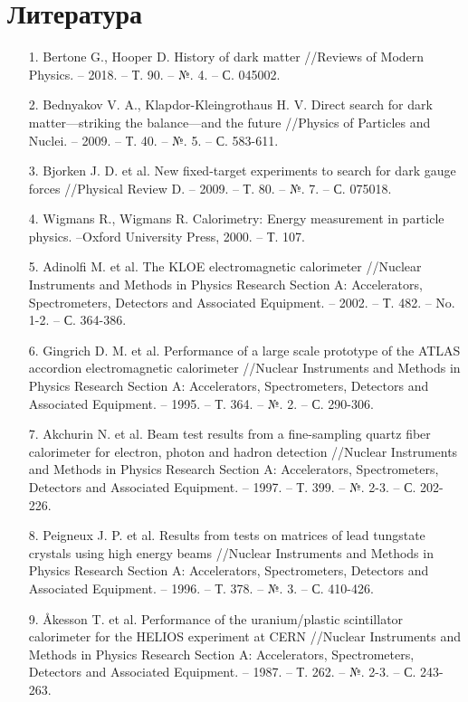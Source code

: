 \newpage
\section*{Литература} \label{sec:lit}

 \begin{itemize}[leftmargin=1.6\parindent, wide]
\item [1.] Bertone G., Hooper D. History of dark matter //Reviews of Modern Physics. – 2018. – Т. 90. – №. 4. – С. 045002.
\item [2.] Bednyakov V. A., Klapdor-Kleingrothaus H. V. Direct search for dark matter—striking the balance—and the future //Physics of Particles and Nuclei. – 2009. – Т. 40. – №. 5. – С. 583-611.
\item [3.] Bjorken J. D. et al. New fixed-target experiments to search for dark gauge forces //Physical Review D. – 2009. – Т. 80. – №. 7. – С. 075018.
\item [4.] Wigmans   R.,   Wigmans   R.   Calorimetry:   Energy   measurement   in particle physics. –Oxford University Press, 2000. – Т. 107.
\item [5.] Adinolfi  M.  et  al.  The  KLOE  electromagnetic  calorimeter  //Nuclear Instruments   and   Methods   in   Physics   Research   Section   A:   Accelerators, Spectrometers, Detectors and Associated Equipment. – 2002. – Т. 482. – No. 1-2. – С. 364-386.
\item [6.] Gingrich D. M. et al. Performance of a large scale prototype of the ATLAS accordion electromagnetic calorimeter //Nuclear Instruments and Methods in Physics Research Section A: Accelerators, Spectrometers, Detectors and Associated Equipment. – 1995. – Т. 364. – №. 2. – С. 290-306.
\item[7.] Akchurin N. et al. Beam test results from a fine-sampling quartz fiber calorimeter for electron, photon and hadron detection //Nuclear Instruments and Methods in Physics Research Section A: Accelerators, Spectrometers, Detectors and Associated Equipment. – 1997. – Т. 399. – №. 2-3. – С. 202-226.
\item[8.] Peigneux J. P. et al. Results from tests on matrices of lead tungstate crystals using high energy beams //Nuclear Instruments and Methods in Physics Research Section A: Accelerators, Spectrometers, Detectors and Associated Equipment. – 1996. – Т. 378. – №. 3. – С. 410-426.
\item[9.] Åkesson T. et al. Performance of the uranium/plastic scintillator calorimeter for the HELIOS experiment at CERN //Nuclear Instruments and Methods in Physics Research Section A: Accelerators, Spectrometers, Detectors and Associated Equipment. – 1987. – Т. 262. – №. 2-3. – С. 243-263.

\end{itemize}
